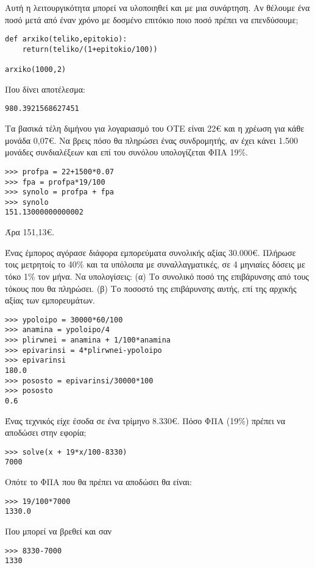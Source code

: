 Αυτή η λειτουργικότητα μπορεί να υλοποιηθεί και με μια συνάρτηση. Αν θέλουμε ένα ποσό μετά από έναν χρόνο με δοσμένο επιτόκιο  ποιο ποσό πρέπει να επενδύσουμε;
\begin{lstlisting}
def arxiko(teliko,epitokio):
    return(teliko/(1+epitokio/100))

arxiko(1000,2)
\end{lstlisting}
Που δίνει αποτέλεσμα:
\begin{lstlisting}
980.3921568627451
\end{lstlisting}
\begin{exercise}
Τα βασικά τέλη διμήνου για λογαριασμό του ΟΤΕ είναι 22€ και η χρέωση για
κάθε μονάδα 0,07€. Να βρεις πόσο θα πληρώσει ένας συνδρομητής, αν έχει
κάνει 1.500 μονάδες συνδιαλέξεων και επί του συνόλου υπολογίζεται ΦΠΑ 19\%.
\end{exercise}
\begin{lstlisting}
>>> profpa = 22+1500*0.07
>>> fpa = profpa*19/100
>>> synolo = profpa + fpa
>>> synolo
151.13000000000002
\end{lstlisting}
Άρα 151,13€.
\begin{exercise}
Ένας έμπορος αγόρασε διάφορα εμπορεύματα συνολικής αξίας 30.000€. Πλήρωσε τοις
μετρητοίς το 40\% και τα υπόλοιπα με συναλλαγματικές, σε 4 μηνιαίες δόσεις με τόκο 1\% τον
μήνα. Να υπολογίσεις: (α) Το συνολικό ποσό της επιβάρυνσης από τους τόκους που θα
πληρώσει. (β) Το ποσοστό της επιβάρυνσης αυτής, επί της αρχικής αξίας των εμπορευμάτων.
\end{exercise}
\begin{lstlisting}
>>> ypoloipo = 30000*60/100
>>> anamina = ypoloipo/4
>>> plirwnei = anamina + 1/100*anamina
>>> epivarinsi = 4*plirwnei-ypoloipo
>>> epivarinsi
180.0
>>> pososto = epivarinsi/30000*100
>>> pososto
0.6
\end{lstlisting}
\begin{exercise}
Ένας τεχνικός είχε έσοδα σε ένα τρίμηνο 8.330€. Πόσο ΦΠΑ (19\%) πρέπει να αποδώσει
στην εφορία;
\end{exercise}
\begin{lstlisting}
>>> solve(x + 19*x/100-8330)
7000
\end{lstlisting}
Οπότε το ΦΠΑ που θα πρέπει να αποδώσει θα είναι:
\begin{lstlisting}
>>> 19/100*7000
1330.0
\end{lstlisting}
Που μπορεί να βρεθεί και σαν
\begin{lstlisting}
>>> 8330-7000
1330
\end{lstlisting}

